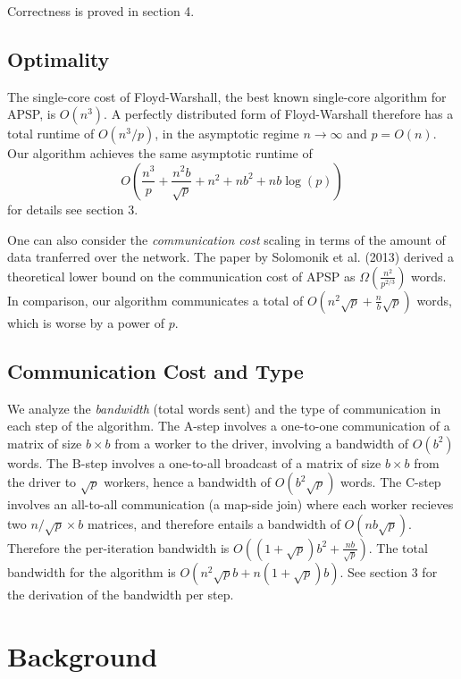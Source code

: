 \documentclass{article} %
\begin{document}
Correctness is proved in section 4.

\subsection{Optimality}

The single-core cost of Floyd-Warshall, the best known single-core
algorithm for APSP, is $O(n^3)$.  A perfectly distributed form of
Floyd-Warshall therefore has a total runtime of $O(n^3/p)$, in the
asymptotic regime $n \to \infty$ and $p = O(n)$.  Our algorithm
achieves the same asymptotic runtime of
\[
O\left(\frac{n^3}{p} + \frac{n^2b}{\sqrt{p}} + n^2 + nb^2 + nb\log(p)\right)
\]
for details see section 3.

One can also consider the \emph{communication cost} scaling in terms
of the amount of data tranferred over the network.  The paper by
Solomonik et al. (2013) derived a theoretical lower bound on the
communication cost of APSP as $\Omega(\frac{n^2}{p^{2/3}})$ words.  In
comparison, our algorithm communicates a total of $O(n^2\sqrt{p} + \frac{n}{b}\sqrt{p})$
words, which is worse by a power of $p$.

\subsection{Communication Cost and Type}

We analyze the \emph{bandwidth} (total words sent) and the type of
communication in each step of the algorithm.  The A-step involves a
one-to-one communication of a matrix of size $b \times b$ from a
worker to the driver, involving a bandwidth of $O(b^2)$ words.  The
B-step involves a one-to-all broadcast of a matrix of size $b\times b$
from the driver to $\sqrt{p}$ workers, hence a bandwidth of $O(b^2
\sqrt{p})$ words.  The C-step involves an all-to-all communication (a
map-side join) where each worker recieves two $n/\sqrt{p} \times b$
matrices, and therefore entails a bandwidth of $O(nb\sqrt{p})$.
Therefore the per-iteration bandwidth is $O((1 + \sqrt{p})b^2 +
\frac{nb}{\sqrt{p}})$.  The total bandwidth for the algorithm is
$O(n^2\sqrt{p}b + n(1+\sqrt{p})b)$.  See section 3 for the derivation
of the bandwidth per step.

\section{Background}
\end{document}

